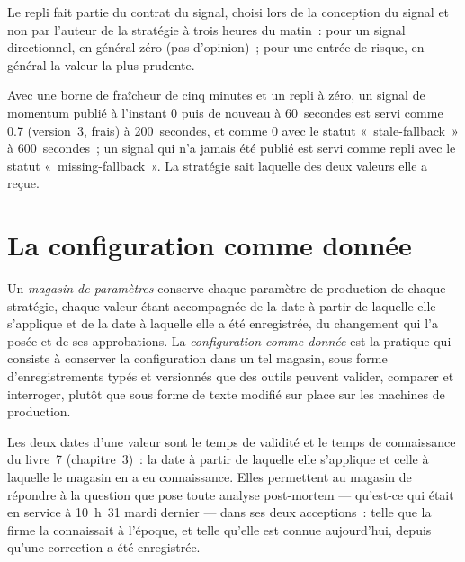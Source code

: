 Le repli fait partie du contrat du signal, choisi lors de la conception du signal et non par l'auteur de la stratégie à trois heures du matin~: pour
un signal directionnel, en général zéro (pas d'opinion)~; pour une entrée de risque, en général la valeur la plus prudente.

\label{lst:pl:signal-serving-and-parameter-management:service}

Avec une borne de fraîcheur de cinq minutes et un repli à zéro, un signal de momentum publié à l'instant 0 puis de nouveau à 60~secondes est servi
comme 0.7 (version~3, frais) à 200~secondes, et comme 0 avec le statut «~stale-fallback~» à 600~secondes~; un signal qui n'a jamais été publié est servi comme
repli avec le statut «~missing-fallback~». La stratégie sait laquelle des deux valeurs elle a reçue.

\section{La configuration comme donnée}

\begin{definition}\label{def:pl:signal-serving-and-parameter-management:store}
Un \emph{magasin de paramètres} conserve chaque paramètre de production de chaque stratégie, chaque valeur étant accompagnée de la date à partir de laquelle
elle s'applique et de la date à laquelle elle a été enregistrée, du changement qui l'a posée et de ses approbations. La \emph{configuration comme donnée} est
la pratique qui consiste à conserver la configuration dans un tel magasin, sous forme d'enregistrements typés et versionnés que des outils peuvent valider, comparer et interroger, plutôt que
sous forme de texte modifié sur place sur les machines de production.
\end{definition}

Les deux dates d'une valeur sont le temps de validité et le temps de connaissance du livre~7 (chapitre~3)~: la date à partir de laquelle elle s'applique et celle
à laquelle le magasin en a eu connaissance. Elles permettent au magasin de répondre à la question que pose toute analyse post-mortem --- qu'est-ce qui était en service à 10~h~31 mardi dernier --- dans ses deux acceptions~: telle que la
firme la connaissait à l'époque, et telle qu'elle est connue aujourd'hui, depuis qu'une correction a été enregistrée.

